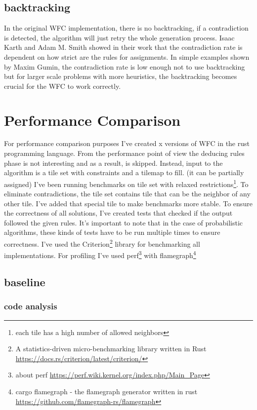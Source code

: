 \documentclass[shortabstract, english, inz]{iithesis}
\begin{document}
\section{backtracking}
\label{backtracking}
In the original WFC implementation, there is no backtracking, if a contradiction is detected, the algorithm will just retry the whole generation process. Isaac Karth and Adam M. Smith showed in their work that the contradiction rate is dependent on how strict are the rules for assignments. In simple examples shown by Maxim Gumin, the contradiction rate is low enough not to use backtracking but for larger scale problems with more heuristics, the backtracking becomes crucial for the WFC to work correctly.
\cite{Smith}



\chapter{Performance Comparison}
\label{chapter4}
For performance comparison purposes I've created x versions of WFC in the rust programming language. From the performance point of view the deducing rules phase is not interesting and as a result, is skipped. Instead, input to the algorithm is a tile set with constraints and a tilemap to fill. (it can be partially assigned) I've been running benchmarks on tile set with relaxed restrictions\footnote{each tile has a high number of allowed neighbors}. To eliminate contradictions, the tile set contains tile that can be the neighbor of any other tile. I've added that special tile to make benchmarks more stable.\break
To ensure the correctness of all solutions, I've created tests that checked if the output followed the given rules. It's important to note that in the case of probabilistic algorithms, these kinds of tests have to be run multiple times to ensure correctness.\break
I've used the Criterion\footnote{A statistics-driven micro-benchmarking library written in Rust \url{https://docs.rs/criterion/latest/criterion/}} library for benchmarking all implementations.
For profiling I've used perf\footnote{about perf \url{https://perf.wiki.kernel.org/index.php/Main_Page}} with flamegraph\footnote{cargo flamegraph - the flamegraph generator written in rust \url{https://github.com/flamegraph-rs/flamegraph}}
    \section{baseline}
        \subsection{code analysis}
\end{document}
